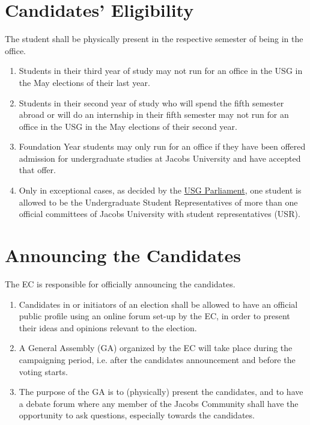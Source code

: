 \documentclass[12pt]{LaTeX_Misc/constitution}
\begin{document}
\section{Candidates' Eligibility}
The student shall be physically present in the respective semester of being in the office.
\begin{enumerate}[label={\textbf{\S\arabic*}}]
\item
Students in their third year of study may not run for an office in the USG in the May elections of their last year.

\item
Students in their second year of study who will spend the fifth semester abroad or will do an internship in their fifth semester may not run for an office in the USG in the May elections of their second year.

\item
Foundation Year students may only run for an office if they have been offered admission for undergraduate studies at Jacobs University and have accepted that offer.

\item 
Only in exceptional cases, as decided by the \hyperref[USGParliamentDef]{USG Parliament}, one student is allowed to be the Undergraduate Student Representatives of more than one official committees of Jacobs University with student representatives (USR).

\end{enumerate}

\section{Announcing the Candidates}
The EC is responsible for officially announcing the candidates.
\begin{enumerate}[label={\textbf{\S\arabic*}}]
\item
Candidates in or initiators of an election shall be allowed to have an official public profile using an online forum set-up by the EC, in order to present their ideas and opinions relevant to the election.
\item
A General Assembly (GA) organized by the EC will take place during the campaigning period, i.e. after the candidates announcement and before the voting starts.
\item
The purpose of the GA is to (physically) present the candidates, and to have a debate forum where any member of the Jacobs Community shall have the opportunity to ask questions, especially towards the candidates.
\end{enumerate}
\end{document}
